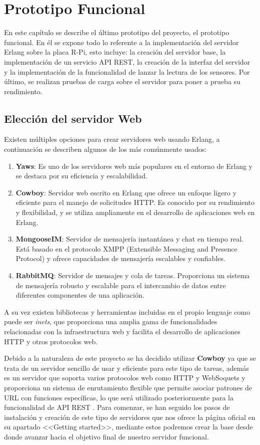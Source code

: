 \chapter{Prototipo Funcional}

En este capítulo se describe el último prototipo del proyecto, el prototipo funcional. En él se expone todo lo referente a la implementación del servidor Erlang sobre la placa R-Pi, esto incluye: la creación del servidor base, la implementación de un servicio API REST, la creación de la interfaz del servidor y la implementación de la funcionalidad de lanzar la lectura de los sensores. Por último, se realizan pruebas de carga sobre el servidor para poner a prueba su rendimiento.

\section{Elección del servidor Web}

Existen múltiples opciones para crear servidores web usando Erlang, a continuación se describen algunos de los más comúnmente usados:
\begin{enumerate}
    \item \textbf{Yaws}: Es uno de los servidores web más populares en el entorno de Erlang y se destaca por su eficiencia y escalabilidad.
    \item \textbf{Cowboy}: Servidor web escrito en Erlang que ofrece un enfoque ligero y eficiente para el manejo de solicitudes HTTP. Es conocido por su rendimiento y flexibilidad, y se utiliza ampliamente en el desarrollo de aplicaciones web en Erlang.
    \item \textbf{MongooseIM}: Servidor de mensajería instantánea y chat en tiempo real. Está basado en el protocolo XMPP (Extensible Messaging and Presence Protocol) y ofrece capacidades de mensajería escalables y confiables.
    \item \textbf{RabbitMQ}: Servidor de mensajes y cola de tareas. Proporciona un sistema de mensajería robusto y escalable para el intercambio de datos entre diferentes componentes de una aplicación.
\end{enumerate}

A su vez existen bibliotecas y herramientas incluidas en el propio lenguaje como puede ser \textit{inets}, que proporciona una amplia gama de funcionalidades relacionadas con la infraestructura web y facilita el desarrollo de aplicaciones HTTP y otros protocolos web.

Debido a la naturaleza de este proyecto se ha decidido utilizar \textbf{Cowboy} ya que se trata de un servidor sencillo de usar y eficiente para este tipo de tareas, además es un servidor que soporta varios protocolos web como HTTP y WebSoquets y proporciona un sistema de enrutamiento flexible que permite asociar patrones de URL con funciones específicas, lo que será utilizado posteriormente para la funcionalidad de API REST . Para comenzar, se han seguido los pasos de instalación y creación de este tipo de servidores que nos ofrece la página oficial en su apartado <<Getting started>>, mediante estos podremos crear la base desde donde avanzar hacia el objetivo final de nuestro servidor funcional.

